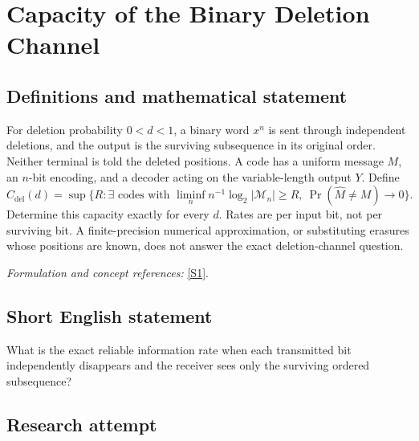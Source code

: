 \documentclass[11pt,a4paper]{article}
\newcommand{\sref}[2]{\hyperlink{source:#1:#2}{[S#2]}}
\newif\ifshowcatalogue
\newcommand{\cataloguescope}[1]{\ifshowcatalogue
 \paragraph{Exact scope in the supplied catalogue.}
 \begin{quote}\small #1\end{quote}\fi}
\numberwithin{equation}{section}
\begin{document}
\setcounter{section}{0}
\clearpage
\section*{\texorpdfstring{Capacity of the Binary Deletion Channel}{Capacity of the Binary Deletion Channel}}\label{statement}
\subsection{Definitions and mathematical statement}
For deletion probability $0<d<1$, a binary word $x^n$ is sent through independent deletions, and the output is the surviving subsequence in its original order. Neither terminal is told the deleted positions. A code has a uniform message $M$, an $n$-bit encoding, and a decoder acting on the variable-length output $Y$. Define
\[
 C_{\mathrm{del}}(d)=\sup\{R:\exists\text{ codes with }\liminf_n n^{-1}\log_2|\mathcal M_n|\ge R,
 \ \Pr(\widehat M\ne M)\to0\}.
\]
Determine this capacity exactly for every $d$. Rates are per input bit, not per surviving bit. A finite-precision numerical approximation, or substituting erasures whose positions are known, does not answer the exact deletion-channel question.
\par\smallskip\textit{Formulation and concept references:} \sref{statement}{1}.
\cataloguescope{Determine the exact average-error Shannon capacity C\_del(d), in bits per input bit, of the binary deletion channel for every real d with 0<d<1. Each input bit is independently deleted with probability d; surviving bits retain their order, and neither terminal observes the deletion pattern.}
\subsection{Short English statement}
What is the exact reliable information rate when each transmitted bit independently disappears and the receiver sees only the surviving ordered subsequence?
\subsection{Research attempt}
\end{document}
